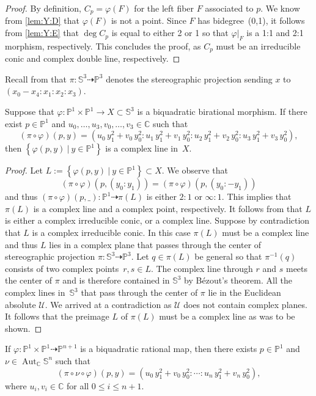 \documentclass[11pt]{article}
\newcommand{\RL}[2]{\Cref{lem:#1}\ref{lem:#1:#2}}
\newcommand{\C}{\mathbb{C}}
\renewcommand{\P}{\mathbb{P}}
\renewcommand{\S}{\mathbb{S}}
\newcommand{\cU}{\mathcal{U}}
\renewcommand{\c}{\colon}
\newcommand{\dto}{\dasharrow}
\newcommand{\aut}{\operatorname{Aut}}
\newcommand{\set}[2]{\left\{#1 ~|~ #2\right\}}
\newcommand{\resp}{respectively}
\newcommand{\st}{such that }
\begin{document}
\begin{proof}
By definition, $C_p=\varphi(F)$ for the left fiber $F$ associated to $p$.
We know from \RL{Y}{D} that $\varphi(F)$ is not a point.
Since $F$ has bidegree~(0,1), it follows from \RL{Y}{E}
that $\deg C_p$ is equal to either 2 or 1 so that $\varphi|_F$ is a 1:1 and 2:1 morphism, \resp.
This concludes the proof, as $C_p$ must be an irreducible conic and complex double line, \resp.
\end{proof}

Recall from  that
$\pi\c\S^3\dto\P^3$ denotes the stereographic projection
sending $x$ to $(x_0-x_4:x_1:x_2:x_3)$.

\begin{lemma}
\label{lem:L}
Suppose that $\varphi\c\P^1\times\P^1\to X\subset \S^3$ is a biquadratic birational morphism.
If there exist $p\in\P^1$
and
$u_0,\ldots,u_3,v_0,\ldots,v_3\in\C$
such that
\[
(\pi\circ\varphi)(p,y)=
(
u_0\,y_1^2+v_0\,y_0^2:
u_1\,y_1^2+v_1\,y_0^2:
u_2\,y_1^2+v_2\,y_0^2:
u_3\,y_1^2+v_3\,y_0^2
)
,
\]
then $\set{\varphi(p,y)}{y\in\P^1}$ is a complex line in~$X$.
\end{lemma}

\begin{proof}
Let $L:=\set{\varphi(p,y)}{y\in\P^1}\subset X$.
We observe that
\[
(\pi\circ\varphi)(p,(y_0:y_1))=(\pi\circ\varphi)(p,(y_0:-y_1))
\]
and thus $(\pi\circ\varphi)(p,\_)\c \P^1\dto \pi(L)$
is either $2:1$ or $\infty:1$.
This implies that $\pi(L)$ is a complex line and a complex point, \resp.
It follows from  that $L$ is
either a complex irreducible conic, or a complex line.
Suppose by contradiction that $L$ is a complex irreducible conic.
In this case $\pi(L)$ must be a complex line and thus $L$ lies in a complex plane
that passes through the center of stereographic projection $\pi\c \S^3\dto \P^3$.
Let $q\in\pi(L)$ be general so that $\pi^{-1}(q)$ consists of two complex points~$r,s\in L$.
The complex line through $r$ and $s$ meets the center of $\pi$ and
is therefore contained in $\S^3$ by B\'ezout's theorem.
All the complex lines in~$\S^3$ that pass through
the center of $\pi$ lie in the Euclidean absolute $\cU$.
We arrived at a contradiction as $\cU$ does not contain complex planes.
It follows that the preimage $L$ of $\pi(L)$
must be a complex line as was to be shown.
\end{proof}

\begin{lemma}
\label{lem:coord}
If $\varphi\c\P^1\times\P^1\dto\P^{n+1}$ is a biquadratic rational map,
then there exists $p\in\P^1$ and $\nu\in\aut_\C\S^n$ \st
\[
(\pi\circ\nu\circ \varphi)(p,y)=(u_0\,y_1^2+v_0\,y_0^2:\cdots:u_n\,y_1^2+v_n\,y_0^2),
\]
where $u_i,v_i\in \C$ for all $0\leq i\leq n+1$.
\end{lemma}
\end{document}
